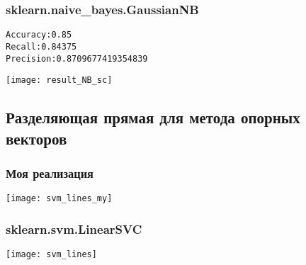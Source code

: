 \subsubsection{sklearn.naive\_bayes.GaussianNB}
\begin{alltt}
Accuracy: 0.85
Recall: 0.84375
Precision: 0.8709677419354839
\end{alltt}
\begin{center}
\texttt{[image: result\_NB\_sc]}
\end{center}
\pagebreak

\subsection{Разделяющая прямая для метода опорных векторов}
\subsubsection{Моя реализация}
\begin{center}
\texttt{[image: svm\_lines\_my]}
\end{center}
\pagebreak

\subsubsection{sklearn.svm.LinearSVC}
\begin{center}
\texttt{[image: svm\_lines]}
\end{center}

\pagebreak
